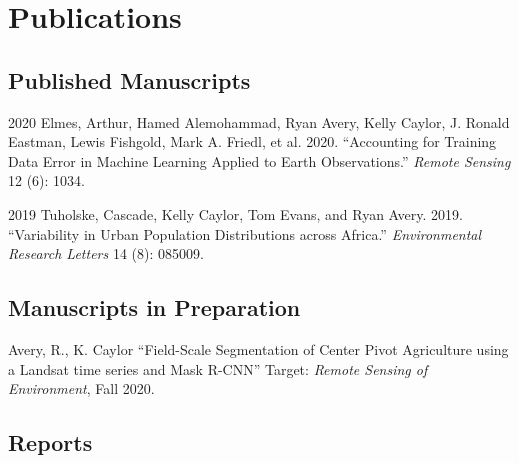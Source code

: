 \documentclass[12pt,letterpaper]{report}
\begin{document}
	
	
    \section*{Publications}
	
    \subsection*{Published Manuscripts}

    \begin{tablist}
    
        \item[2020] \tab Elmes, Arthur, Hamed Alemohammad, Ryan Avery, Kelly Caylor, J. Ronald Eastman, Lewis Fishgold, Mark A. Friedl, et al. 2020. \enquote{Accounting for Training Data Error in Machine Learning Applied to Earth Observations.} \textit{Remote Sensing} 12 (6): 1034.

        \item[2019] \tab Tuholske, Cascade, Kelly Caylor, Tom Evans, and Ryan Avery. 2019. \enquote{Variability in Urban Population Distributions across Africa.} \textit{Environmental Research Letters} 14 (8): 085009.
    
    \end{tablist}
    
    \subsection*{Manuscripts in Preparation}

    \begin{tablist}

        \item[\the\year] \tab Avery, R., K. Caylor \enquote{Field-Scale Segmentation of Center Pivot Agriculture using a Landsat time series and Mask R-CNN} Target: \textit{Remote Sensing of Environment}, Fall 2020.
    
    \end{tablist}


    \subsection*{Reports}
\end{document}

